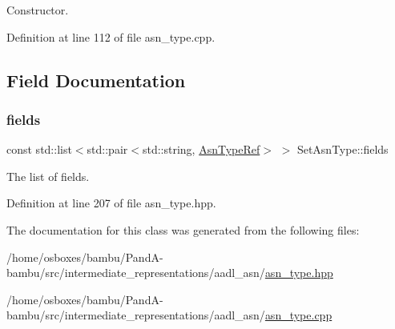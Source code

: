 Constructor. 



Definition at line 112 of file asn\+\_\+type.\+cpp.



\subsection{Field Documentation}
\mbox{\label{classSetAsnType_ae12f92b33040638cabb96f2e04ded0db}} 
\subsubsection{\texorpdfstring{fields}{fields}}
{\footnotesize\ttfamily const std\+::list$<$std\+::pair$<$std\+::string, \hyperlink{asn__type_8hpp_a456d7cf50c15d087cc0428ae80834b35}{Asn\+Type\+Ref}$>$ $>$ Set\+Asn\+Type\+::fields}



The list of fields. 



Definition at line 207 of file asn\+\_\+type.\+hpp.



The documentation for this class was generated from the following files\+:\begin{DoxyCompactItemize}
\item 
/home/osboxes/bambu/\+Pand\+A-\/bambu/src/intermediate\+\_\+representations/aadl\+\_\+asn/\hyperlink{asn__type_8hpp}{asn\+\_\+type.\+hpp}\item 
/home/osboxes/bambu/\+Pand\+A-\/bambu/src/intermediate\+\_\+representations/aadl\+\_\+asn/\hyperlink{asn__type_8cpp}{asn\+\_\+type.\+cpp}\end{DoxyCompactItemize}
